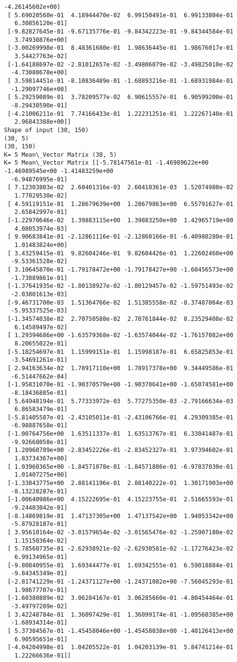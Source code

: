 \documentclass[11pt]{article}
\begin{document}
\begin{Verbatim}[commandchars=\\\{\}]
  -4.26145602e+00]
 [ 5.69020560e-01  4.18944470e-02  6.99150491e-01  6.99133804e-01
   6.30856120e-01]
 [-9.82827645e-01 -9.67135776e-01 -9.84342223e-01 -9.84344584e-01
   3.74930876e+00]
 [-3.00269998e-01  8.48361680e-01  1.98636445e-01  1.98676017e-01
   3.54427763e-02]
 [-1.64188697e-02 -2.81012657e-02 -3.49806079e-02 -3.49825010e-02
  -4.73080678e+00]
 [ 3.59814451e-01 -8.10836489e-01 -1.68893216e-01 -1.68931984e-01
  -1.29097746e+00]
 [ 5.29259089e-01  3.78209577e-02  6.90615557e-01  6.90599200e-01
  -8.29430590e-01]
 [-4.21006211e-01  7.74166433e-01  1.22231251e-01  1.22267140e-01
   2.96843388e+00]]
Shape of input (30, 150)
(30, 5)
(30, 150)
K= 5 Mean\_Vector Matrix (30, 5)
K= 5 Mean\_Vector Matrix [[-5.78147561e-01 -1.46989622e+00 -1.46989545e+00 -1.41483259e+00
  -6.94876995e-01]
 [ 7.12303803e-02  2.60401316e-03  2.60410361e-03  1.52074980e-02
   1.77029530e-02]
 [ 4.59119151e-01  1.28679639e+00  1.28679863e+00  6.55791627e-01
   2.65842997e-01]
 [-1.22970646e-02  1.39883115e+00  1.39883250e+00  1.42965719e+00
   4.08053974e-03]
 [ 9.90683841e-01 -2.12861116e-01 -2.12860166e-01 -6.40980280e-01
   1.01483824e+00]
 [ 3.43259415e-01  9.82604246e-01  9.82604426e-01  1.22602460e+00
  -9.53361528e-02]
 [ 3.10645870e-01 -1.79178472e+00 -1.79178427e+00 -1.60456573e+00
  -1.73889861e-01]
 [-1.37641935e-02 -1.80138927e-02 -1.80129457e-02 -1.59751493e-02
  -2.03801613e-03]
 [-9.46731700e-03  1.51364766e-02  1.51385558e-02 -8.37487064e-03
  -5.95337525e-03]
 [-1.34574038e-02  2.70750588e-02  2.70761844e-02  8.23529408e-02
   6.14589497e-02]
 [ 1.29394686e+00 -1.63579368e-02 -1.63574044e-02 -1.76157082e+00
   8.20655022e-01]
 [-5.18254697e-01  1.15999151e-01  1.15998187e-01  6.65825853e-01
  -3.54691261e-01]
 [ 2.94163634e-02  1.78917110e+00  1.78917378e+00  9.34449586e-01
  -6.51447662e-04]
 [-1.95831070e-01 -1.90370579e+00 -1.90370641e+00 -1.65074581e+00
  -8.18436885e-01]
 [ 5.64948194e-01  5.77333972e-03  5.77275350e-03 -2.79166634e-03
   6.86583479e-01]
 [-5.81405587e-01 -2.43105011e-01 -2.43106766e-01  4.29309385e-01
  -6.98887658e-01]
 [-1.00764756e+00  1.63511337e-01  1.63513767e-01  6.33041487e-01
  -9.92668058e-01]
 [ 1.20960789e+00 -2.83452226e-01 -2.83452327e-01  3.97394602e-01
   1.83734367e+00]
 [ 1.03960365e+00 -1.84571078e-01 -1.84571886e-01 -6.97837030e-01
   1.01407275e+00]
 [-1.33843775e+00  2.88141196e-01  2.88140222e-01  1.30171903e+00
  -8.13228287e-01]
 [-1.00640986e+00  4.15222695e-01  4.15223755e-01  2.51665593e-01
  -9.24403042e-01]
 [-8.14869819e-01  1.47137305e+00  1.47137542e+00  1.94053342e+00
  -5.87928187e-01]
 [ 3.95610164e-02 -3.01579654e-02 -3.01565476e-02 -1.25907180e-02
   1.15150364e-02]
 [ 5.78560735e-01 -2.62938921e-02 -2.62930581e-02 -1.17276423e-02
   6.99134965e-01]
 [-9.80840955e-01  1.69344477e-01  1.69342555e-01  6.59018884e-01
  -9.84345349e-01]
 [-2.81741229e-01 -1.24371127e+00 -1.24371082e+00 -7.56045293e-01
   1.98677707e-01]
 [-1.60380889e-02  3.06284167e-01  3.06285660e-01 -4.80454464e-01
  -3.49797289e-02]
 [ 3.42248784e-01  1.36097429e-01  1.36099174e-01 -1.09560385e+00
  -1.68934314e-01]
 [ 5.37384567e-01 -1.45458046e+00 -1.45458038e+00 -1.40126413e+00
   6.90595651e-01]
 [-4.04204998e-01  1.04205522e-01  1.04203139e-01  5.84741214e-01
   1.22266636e-01]]


\end{Verbatim}
\end{document}

